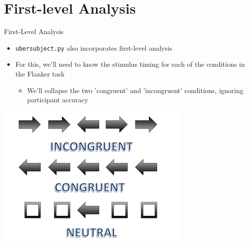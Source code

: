 \documentclass[t,12pt]{beamer}
\begin{document}
\section{First-level Analysis}
\begin{frame}{First-Level Analysis}
\vspace{10pt}
\begin{itemize}
\setlength\itemsep{1em}
\item \texttt{uber\textunderscore{}subject.py} also incorporates first-level analysis
\item For this, we'll need to know the stimulus timing for each of the conditions in the Flanker task
\vspace{4pt}
\begin{itemize}
\item We'll collapse the two 'congruent' and 'incongruent' conditions, ignoring participant accuracy
\end{itemize}
\end{itemize}
\vspace{4pt}
\centering
\includegraphics[width=.5\textwidth]{images/flanker_task.jpg}
\end{frame}
\end{document}
